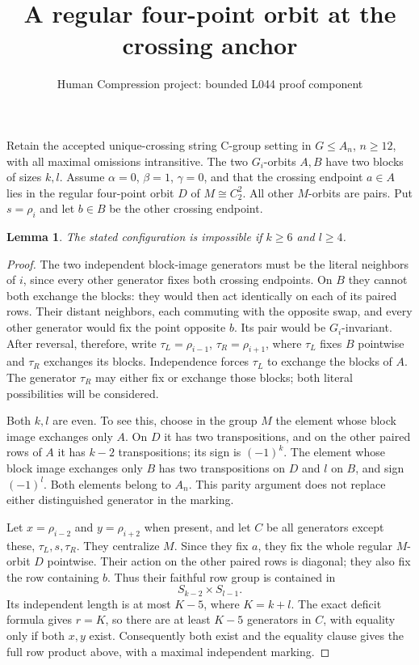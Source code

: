 \documentclass[11pt,a4paper]{article}
\title{A regular four-point orbit at the crossing anchor}
\author{Human Compression project: bounded L044 proof component}
\date{}
\newtheorem{lemma}{Lemma}
\begin{document}
\maketitle
Retain the accepted unique-crossing string C-group setting in
$G\leq A_n$, $n\geq12$, with all maximal omissions intransitive. The two
$G_i$-orbits $A,B$ have two blocks of sizes $k,l$. Assume
$\alpha=0$, $\beta=1$, $\gamma=0$, and that the crossing
endpoint $a\in A$ lies in the regular four-point orbit $D$
of $M\cong C_2^2$. All other $M$-orbits are pairs. Put
$s=\rho_i$ and let $b\in B$ be the other crossing endpoint.

\begin{lemma}
The stated configuration is impossible if $k\geq6$ and
$l\geq4$.
\end{lemma}
\begin{proof}
The two independent block-image generators must be the
literal neighbors of $i$, since every other generator fixes
both crossing endpoints. On $B$ they cannot both exchange
the blocks: they would then act identically on each of its
paired rows. Their distant neighbors, each commuting with
the opposite swap, and every other generator would fix the
point opposite $b$. Its pair would be $G_i$-invariant.
After reversal, therefore, write $\tau_L=\rho_{i-1}$,
$\tau_R=\rho_{i+1}$, where $\tau_L$ fixes $B$ pointwise
and $\tau_R$ exchanges its blocks. Independence forces
$\tau_L$ to exchange the blocks of $A$. The generator
$\tau_R$ may either fix or exchange those blocks; both
literal possibilities will be considered.

Both $k,l$ are even. To see this, choose in the group $M$
the element whose block image exchanges only $A$.
On $D$ it has two transpositions, and on the other paired
rows of $A$ it has $k-2$ transpositions; its sign is
$(-1)^k$. The element whose block image exchanges only
$B$ has two transpositions on $D$ and $l$ on $B$,
and sign $(-1)^l$. Both elements belong to $A_n$.
This parity argument does not replace either distinguished
generator in the marking.

Let $x=\rho_{i-2}$ and $y=\rho_{i+2}$ when present, and
let $C$ be all generators except these, $\tau_L,s,\tau_R$.
They centralize $M$. Since they fix $a$, they fix the whole
regular $M$-orbit $D$ pointwise. Their action on the other
paired rows is diagonal; they also fix the row containing
$b$. Thus their faithful row group is contained in
\[
 S_{k-2}\times S_{l-1}.
\]
Its independent length is at most $K-5$, where $K=k+l$.
The exact deficit formula gives $r=K$, so there are at
least $K-5$ generators in $C$, with equality only if both
$x,y$ exist. Consequently both exist and the equality
clause gives the full row product above, with a maximal
independent marking.


\end{proof}
\end{document}
